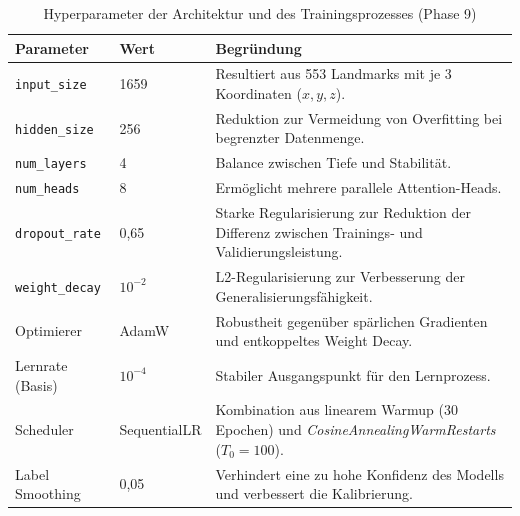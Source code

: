\begin{table}[H]
\centering
\caption{Hyperparameter der Architektur und des Trainingsprozesses (Phase 9)}
\label{tab:model_config}
\begin{tabular}{llp{9.5cm}}
\toprule
Parameter & Wert & Begründung \\
\midrule
\texttt{input\_size} & 1659 & Resultiert aus 553 Landmarks mit je 3 Koordinaten ($x,y,z$). \\
\texttt{hidden\_size} & 256 & Reduktion zur Vermeidung von Overfitting bei begrenzter Datenmenge. \\
\texttt{num\_layers} & 4 & Balance zwischen Tiefe und Stabilität. \\
\texttt{num\_heads} & 8 & Ermöglicht mehrere parallele Attention-Heads. \\
\texttt{dropout\_rate} & 0,65 & Starke Regularisierung zur Reduktion der Differenz zwischen Trainings- und Validierungsleistung. \\
\texttt{weight\_decay} & $10^{-2}$ & L2-Regularisierung zur Verbesserung der Generalisierungsfähigkeit. \\
\midrule
Optimierer & AdamW & Robustheit gegenüber spärlichen Gradienten und entkoppeltes Weight Decay. \\
Lernrate (Basis) & $10^{-4}$ & Stabiler Ausgangspunkt für den Lernprozess. \\
Scheduler & SequentialLR & Kombination aus linearem Warmup (30 Epochen) und \textit{CosineAnnealingWarmRestarts} ($T_0=100$). \\
Label Smoothing & 0,05 & Verhindert eine zu hohe Konfidenz des Modells und verbessert die Kalibrierung. \\
\bottomrule
\end{tabular}
\end{table}